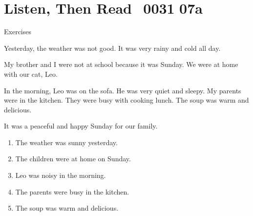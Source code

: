 \documentclass[aspectratio=169,xcolor={dvipsnames,table}]{beamer}
\newcommand{\myaudio}[1]{\href{#1}{\faVolumeUp}}
\begin{document}
\section{Listen, Then Read\,\,\,\,\,{\tiny 0031}\,{\scriptsize \myaudio{./audio/024_past_be_reading.mp3}\,07a}}
\begin{frame}[plain,t]{Exercises}
\vspace*{-8pt}
\begin{tcolorbox}[colframe=ForestGreen,
  colback=NavyBlue!10!white,
  colbacktitle=NavyBlue!40!white,
  coltitle=black, %
before upper={\setlength{\parindent}{1.25em}},
 title={A Rainy Sunday at Home\hfill{\tiny 0031}\quad{\scriptsize \myaudio{./audio/024_past_be_reading.mp3}}}
]
\noindent{}Yesterday, the weather was not good. It was very rainy and cold all day.

My brother and I were not at school because it was Sunday. We were at home with our cat, Leo.

In the morning, Leo was on the sofa. He was very quiet and sleepy.
My parents were in the kitchen. They were busy with cooking lunch.
The soup was warm and delicious. 

It was a peaceful and happy Sunday for our family.
\end{tcolorbox}

\vspace{-4pt}
\vspace{-11pt}
\begin{enumerate}\setlength{\itemsep}{-3.2pt}
\item<2-> The weather was sunny yesterday.\hfill{}
\item<2-> The children were at home on Sunday.\hfill{}
\item<2-> Leo was noisy in the morning.\hfill{}
\item<2-> The parents were busy in the kitchen.\hfill\visible<6->{T}
\item<2-> The soup was warm and delicious.\hfill{}
\end{enumerate}
\end{frame}
\end{document}
